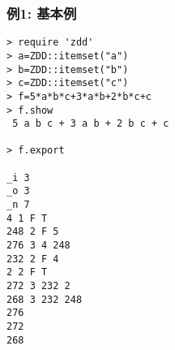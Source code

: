 \subsubsection*{例1: 基本例}



\begin{Verbatim}[baselinestretch=0.7,frame=single]
> require 'zdd'
> a=ZDD::itemset("a")
> b=ZDD::itemset("b")
> c=ZDD::itemset("c")
> f=5*a*b*c+3*a*b+2*b*c+c
> f.show
 5 a b c + 3 a b + 2 b c + c

> f.export

_i 3
_o 3
_n 7
4 1 F T
248 2 F 5
276 3 4 248
232 2 F 4
2 2 F T
272 3 232 2
268 3 232 248
276
272
268
\end{Verbatim}
